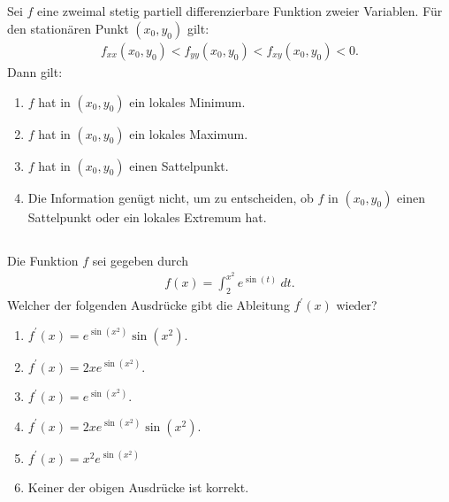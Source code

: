 \subsection*{}
Sei $ f $ eine zweimal stetig partiell differenzierbare Funktion zweier Variablen. Für den stationären Punkt $ (x_0,y_0) $ gilt:
\begin{align*}
	f_{xx}(x_0,y_0) < f_{yy}(x_0,y_0) < f_{xy}(x_0,y_0) < 0.
\end{align*} 
Dann gilt:
\renewcommand{\labelenumi}{(\alph{enumi})}
\begin{enumerate}
\item $ f $ hat in $ (x_0,y_0) $ ein lokales Minimum.
\item $ f $ hat in $ (x_0,y_0) $ ein lokales Maximum.
\item $ f $ hat in $ (x_0,y_0) $ einen Sattelpunkt.
\item Die Information genügt nicht, um zu entscheiden, ob $ f $ in $ (x_0,y_0) $ einen Sattelpunkt oder ein lokales Extremum hat.
\end{enumerate}
\newpage
\subsection*{}
Die Funktion $ f $ sei gegeben durch
\begin{align*}
	f(x) = \int_2^{x^2} e^{\sin(t)} \ dt.
\end{align*}
Welcher der folgenden Ausdrücke gibt die Ableitung $ f^\prime(x) $ wieder?
\renewcommand{\labelenumi}{(\alph{enumi})}
\begin{enumerate}
\item 
$ f^\prime(x) = e^{\sin(x^2)} \sin(x^2)$.
\item 
$ f^\prime(x) = 2 x e^{\sin(x^2)}$.
\item 
$ f^\prime(x) = e^{\sin(x^2)}$.
\item
$ f^\prime(x) = 2 x e^{\sin(x^2)} \sin(x^2)$.
\item 
$ f^\prime(x) = x^2 e^{\sin(x^2)}$ 
\item 
Keiner der obigen Ausdrücke ist korrekt.
\end{enumerate}
\ \\

